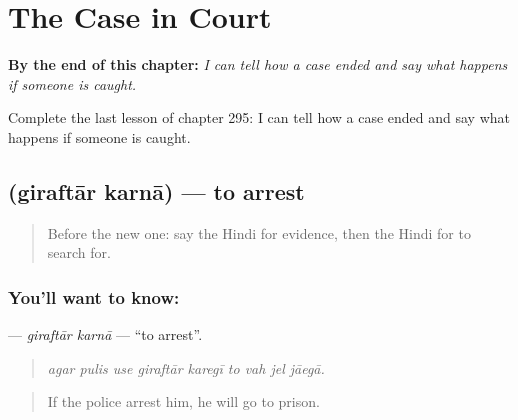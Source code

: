 
\chapter{The Case in Court}
\label{ch:hi-the-case-in-court}

\begin{chapteropening}
\textbf{By the end of this chapter:} \emph{I can tell how a case ended and say what happens if someone is caught.}

Complete the last lesson of chapter 295: I can tell how a case ended and say what happens if someone is caught.
\end{chapteropening}

\section[\texorpdfstring{\hi{गिरफ़्तार} \hi{करना} (giraftār karnā)}{गिरफ़्तार करना (giraftār karnā)}]{  (giraftār karnā) — to arrest}

\label{lesson:HI-C295-giraftarkarna}



\begin{quote}
Before the new one: say the Hindi for evidence, then the Hindi for to search for.
\end{quote}

\subsection*{You'll want to know:  }
\textbf{ } — \emph{giraftār karnā} — \textquotedblleft{}to arrest\textquotedblright{}.

\begin{quote}
        
\end{quote}

\begin{quote}
\emph{agar pulis use giraftār karegī to vah jel jāegā.}
\end{quote}

\begin{quote}
If the police arrest him, he will go to prison.
\end{quote}

